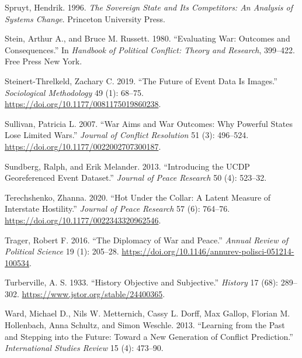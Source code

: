 \documentclass{article}
\newlength{\cslhangindent}
\newlength{\cslentryspacingunit} %
\newenvironment{CSLReferences}[2] %
 {%
  \setlength{\parindent}{0pt}
  \ifodd #1
  \let\oldpar\par
  \def\par{\hangindent=\cslhangindent\oldpar}
  \fi
  \setlength{\parskip}{#2\cslentryspacingunit}
 }%
 {}
\begin{document}
\begin{CSLReferences}{1}{0}
\leavevmode{}%
Spruyt, Hendrik. 1996. \emph{The {Sovereign State} and {Its
Competitors}: {An Analysis} of {Systems Change}}. {Princeton University
Press}.

\leavevmode{}%
Stein, Arthur A., and Bruce M. Russett. 1980. {``Evaluating War:
{Outcomes} and Consequences.''} In \emph{Handbook of Political Conflict:
Theory and Research}, 399--422. {Free Press New York}.

\leavevmode{}%
Steinert-Threlkeld, Zachary C. 2019. {``The {Future} of {Event Data Is
Images}.''} \emph{Sociological Methodology} 49 (1): 68--75.
\url{https://doi.org/10.1177/0081175019860238}.

\leavevmode{}%
Sullivan, Patricia L. 2007. {``War {Aims} and {War Outcomes}: {Why
Powerful States Lose Limited Wars}.''} \emph{Journal of Conflict
Resolution} 51 (3): 496--524.
\url{https://doi.org/10.1177/0022002707300187}.

\leavevmode{}%
Sundberg, Ralph, and Erik Melander. 2013. {``Introducing the {UCDP}
Georeferenced Event Dataset.''} \emph{Journal of Peace Research} 50 (4):
523--32.

\leavevmode{}%
Terechshenko, Zhanna. 2020. {``Hot Under the Collar: {A} Latent Measure
of Interstate Hostility.''} \emph{Journal of Peace Research} 57 (6):
764--76. \url{https://doi.org/10.1177/0022343320962546}.

\leavevmode{}%
Trager, Robert F. 2016. {``The {Diplomacy} of {War} and {Peace}.''}
\emph{Annual Review of Political Science} 19 (1): 205--28.
\url{https://doi.org/10.1146/annurev-polisci-051214-100534}.

\leavevmode{}%
Turberville, A. S. 1933. {``History {Objective} and {Subjective}.''}
\emph{History} 17 (68): 289--302.
\url{https://www.jstor.org/stable/24400365}.

\leavevmode{}%
Ward, Michael D., Nils W. Metternich, Cassy L. Dorff, Max Gallop,
Florian M. Hollenbach, Anna Schultz, and Simon Weschle. 2013.
{``Learning from the Past and Stepping into the Future: {Toward} a New
Generation of Conflict Prediction.''} \emph{International Studies
Review} 15 (4): 473--90.


\end{CSLReferences}
\end{document}
